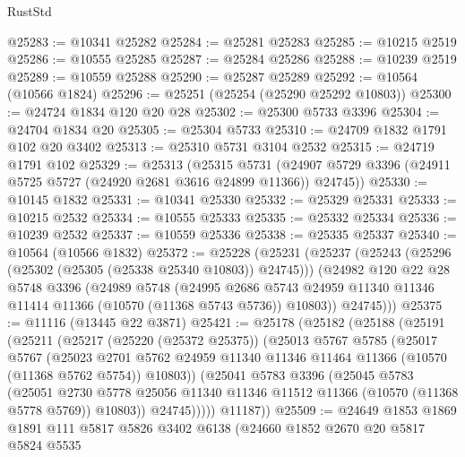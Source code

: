 \begin{lexlean}{RustStd}
\begin{coremodule}
@25283 := @10341 @25282
@25284 := @25281 @25283
@25285 := @10215 @2519
@25286 := @10555 @25285
@25287 := @25284 @25286
@25288 := @10239 @2519
@25289 := @10559 @25288
@25290 := @25287 @25289
@25292 := @10564 (@10566 @1824)
@25296 := @25251 (@25254 (@25290 @25292 @10803))
@25300 := @24724 @1834 @120 @20 @28
@25302 := @25300 @5733 @3396
@25304 := @24704 @1834 @20
@25305 := @25304 @5733
@25310 := @24709 @1832 @1791 @102 @20 @3402
@25313 := @25310 @5731 @3104 @2532
@25315 := @24719 @1791 @102
@25329 := @25313
    (@25315
      @5731
      (@24907 @5729 @3396 (@24911 @5725 @5727 (@24920 @2681 @3616 @24899 @11366)) @24745))
@25330 := @10145 @1832
@25331 := @10341 @25330
@25332 := @25329 @25331
@25333 := @10215 @2532
@25334 := @10555 @25333
@25335 := @25332 @25334
@25336 := @10239 @2532
@25337 := @10559 @25336
@25338 := @25335 @25337
@25340 := @10564 (@10566 @1832)
@25372 := @25228
    (@25231
      (@25237
        (@25243 (@25296 (@25302 (@25305 (@25338 @25340 @10803)) @24745)))
        (@24982
          @120
          @22
          @28
          @5748
          @3396
          (@24989
            @5748
            (@24995
              @2686
              @5743
              @24959
              @11340
              @11346
              @11414
              @11366
              (@10570 (@11368 @5743 @5736))
              @10803))
          @24745)))
@25375 := @11116 (@13445 @22 @3871)
@25421 := @25178
    (@25182
      (@25188
        (@25191
          (@25211
            (@25217
              (@25220 (@25372 @25375))
              (@25013
                @5767
                @5785
                (@25017
                  @5767
                  (@25023
                    @2701
                    @5762
                    @24959
                    @11340
                    @11346
                    @11464
                    @11366
                    (@10570 (@11368 @5762 @5754))
                    @10803))
                (@25041
                  @5783
                  @3396
                  (@25045
                    @5783
                    (@25051
                      @2730
                      @5778
                      @25056
                      @11340
                      @11346
                      @11512
                      @11366
                      (@10570 (@11368 @5778 @5769))
                      @10803))
                  @24745)))))
        @11187))
@25509 := @24649
    @1853
    @1869
    @1891
    @111
    @5817
    @5826
    @3402
    @6138
    (@24660
      @1852
      @2670
      @20
      @5817
      @5824
      @5535

\end{coremodule}
\end{lexlean}
